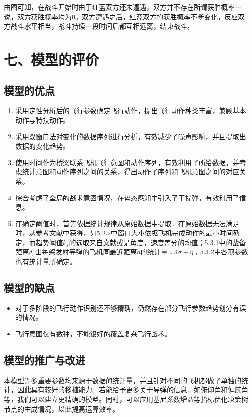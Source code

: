 \documentclass{my_paper}
\begin{document}
由图可知，在战斗开始时由于红蓝双方还未遭遇，双方并不存在所谓获胜概率一说，双方获胜概率均为0。双方遭遇之后，红蓝双方的获胜概率不断变化，反应双方战斗水平相当，战斗持续一段时间后都互相远离，结束战斗。


\section{七、模型的评价}


\subsection{模型的优点}
\begin{enumerate}
    \item 采用定性分析后的飞行参数确定飞行动作，提出飞行动作种类丰富，兼顾基本动作与特技动作。
    \item 采用双窗口法对变化的数据序列进行分析，有效减少了噪声影响，并且提取出数据的变化趋势。
    \item 使用时间作为桥梁联系飞机飞行意图和动作序列，有效利用了所给数据，并考虑统计意图和动作序列之间的关系，得出动作子序列和飞机意图之间的对应关系。
    \item 综合考虑了全局的战术意图情况，在势态感知中引入了干扰弹，有效利用了信息。
    \item 在确定阈值时，首先依据统计规律从原始数据中提取，在原始数据无法满足时，从参考文献中获得，如5.2.2中窗口大小依据飞机完成动作的最小时间确定，而趋势阈值$ k_s $的选取来自文献或是角度，速度差分的均值；5.3.1中的战备距离$d_s$由每架发射导弹的飞机同最近距离$d$的统计量：$3\sigma + \eta$；5.3.2中各项参数也有统计量所确定。
\end{enumerate}

\subsection{模型的缺点}
\begin{itemize}
    \item 对于多阶段的飞行动作识别还不够精确，仍然存在部分飞行参数趋势划分有误的情况。
    \item 飞行意图仅有数种，不能很好的覆盖复杂飞行战术。
\end{itemize}

\subsection{模型的推广与改进}

本模型许多重要参数均来源于数据的统计量，并且针对不同的飞机都做了单独的统计，因此具有较好的移植能力。若能给予更多关于导弹的信息，如俯仰角和偏航角等，我们可以建立更精确的模型。同时，可以应用基尼系数增益等指标优化决策树节点的生成情况，以此提高运算效率。
\newpage
\begin{center}
\end{center}
\end{document}
